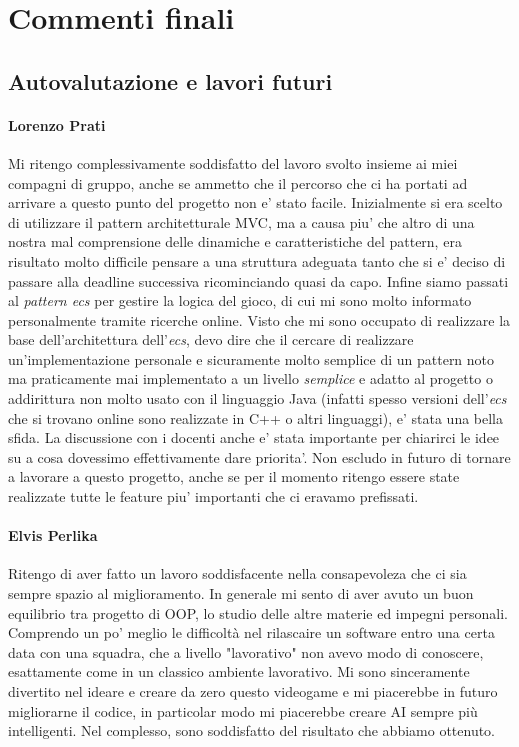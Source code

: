 \documentclass[a4paper,12pt]{report}
\begin{document}
\chapter{Commenti finali}



\section{Autovalutazione e lavori futuri}

\subsubsection{Lorenzo Prati}

Mi ritengo complessivamente soddisfatto del lavoro svolto insieme ai miei compagni di gruppo, anche se ammetto che il percorso che ci ha portati ad arrivare a questo punto del progetto non e' stato facile. Inizialmente si era scelto di utilizzare il pattern architetturale MVC, ma a causa piu' che altro di una nostra mal comprensione delle dinamiche e caratteristiche del pattern, era risultato molto difficile pensare a una struttura adeguata tanto che si e' deciso di passare alla deadline successiva ricominciando quasi da capo. Infine siamo passati al \textit{pattern ecs} per gestire la logica del gioco, di cui mi sono molto informato personalmente tramite ricerche online. Visto che mi sono occupato di realizzare la base dell'architettura dell'\textit{ecs}, devo dire che il cercare di realizzare un'implementazione personale e sicuramente molto semplice di un pattern noto ma praticamente mai implementato a un livello \textit{semplice} e adatto al progetto o addirittura non molto usato con il linguaggio Java (infatti spesso versioni dell'\textit{ecs} che si trovano online sono realizzate in C++ o altri linguaggi), e' stata una bella sfida. La discussione con i docenti anche e' stata importante per chiarirci le idee su a cosa dovessimo effettivamente dare priorita'. Non escludo in futuro di tornare a lavorare a questo progetto, anche se per il momento ritengo essere state realizzate tutte le feature piu' importanti che ci eravamo prefissati.

\subsubsection{Elvis Perlika}
Ritengo di aver fatto un lavoro soddisfacente nella consapevoleza che ci sia sempre spazio
al miglioramento.
In generale mi sento di aver avuto un buon equilibrio tra progetto di OOP, lo studio delle
altre materie ed impegni personali.
Comprendo un po' meglio le difficoltà nel rilascaire un software entro una certa 
data con una squadra, che a livello "lavorativo" non avevo modo di conoscere, esattamente come
in un classico ambiente lavorativo. 
Mi sono sinceramente divertito nel ideare e creare da zero questo videogame e mi piacerebbe 
in futuro migliorarne il codice, in particolar modo mi piacerebbe creare AI sempre più intelligenti. 
Nel complesso, sono soddisfatto del risultato che abbiamo ottenuto.
\end{document}
